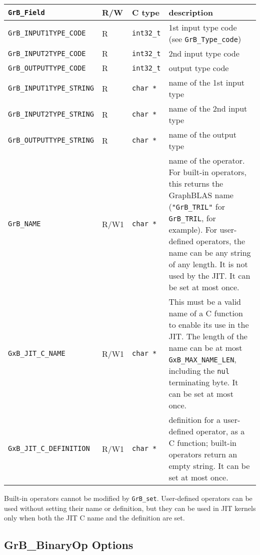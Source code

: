 \noindent
{\small
\begin{tabular}{|l|l|l|p{2.8in}|}
\hline
\verb'GrB_Field'                    & R/W  & C type        & description \\
\hline
\verb'GrB_INPUT1TYPE_CODE'          & R    & \verb'int32_t'& 1st input type code (see \verb'GrB_Type_code') \\
\verb'GrB_INPUT2TYPE_CODE'          & R    & \verb'int32_t'& 2nd input type code \\
\verb'GrB_OUTPUTTYPE_CODE'          & R    & \verb'int32_t'& output type code \\
\verb'GrB_INPUT1TYPE_STRING'        & R    & \verb'char *' & name of the 1st input type \\
\verb'GrB_INPUT2TYPE_STRING'        & R    & \verb'char *' & name of the 2nd input type \\
\verb'GrB_OUTPUTTYPE_STRING'        & R    & \verb'char *' & name of the output type \\
\hline
\verb'GrB_NAME'                     & R/W1 & \verb'char *' &    %
    name of the operator.  For built-in operators, this returns the GraphBLAS
    name (\verb'"GrB_TRIL"' for \verb'GrB_TRIL', for example).
    For user-defined operators, the name can be any string of any length.  It
    is not used by the JIT.  It can be set at most once. \\
\verb'GxB_JIT_C_NAME'               & R/W1 & \verb'char *' &
    This must be a valid name of a C function to enable its use in the JIT.
    The length of the name can be at most \verb'GxB_MAX_NAME_LEN', including
    the \verb'nul' terminating byte.  It can be set at most once. \\
\verb'GxB_JIT_C_DEFINITION'         & R/W1 & \verb'char *' &
    definition for a user-defined operator, as a C function; built-in operators
    return an empty string.  It can be set at most once. \\
\hline
\end{tabular}
}

Built-in operators cannot be modified by \verb'GrB_set'.  User-defined
operators can be used without setting their name or definition, but they can be
used in JIT kernels only when both the JIT C name and the definition are set.

\newpage
\subsection{{\sf GrB\_BinaryOp} Options}
\label{get_set_binop}

